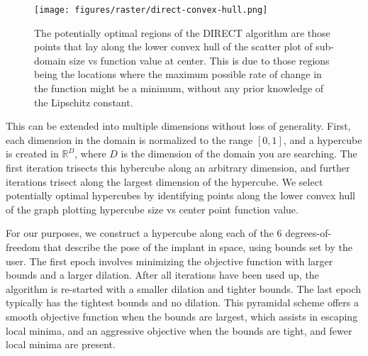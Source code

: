 \begin{figure}[h!]
    \begin{center}
      \texttt{[image: figures/raster/direct-convex-hull.png]}
    \end{center}
    \caption[The potentially optimal regions of the DIRECT algorithm are those points that lay along the lower convex hull of the scatter plot of sub-domain size vs function value at center]{The potentially optimal regions of the DIRECT algorithm are those points that lay along the lower convex hull of the scatter plot of sub-domain size vs function value at center. This is due to those regions being the locations where the maximum possible rate of change in the function might be a minimum, without any prior knowledge of the Lipschitz constant.}
    \label{fig:direct-convex-hull}
\end{figure}

This can be extended into multiple dimensions without loss of generality. First, each dimension in the domain is normalized to the range $[0,1]$, and a hypercube is created in $\mathbb{R}^D$, where $D$ is the dimension of the domain you are searching. The first iteration trisects this hybercube along an arbitrary dimension, and further iterations trisect along the largest dimension of the hypercube. We select potentially optimal hypercubes by identifying points along the lower convex hull of the graph plotting hypercube size vs center point function value.


For our purposes, we construct a hypercube along each of the 6 degrees-of-freedom that describe the pose of the implant in space, using bounds set by the user. The first epoch involves minimizing the objective function with larger bounds and a larger dilation. After all iterations have been used up, the algorithm is re-started with a smaller dilation and tighter bounds. The last epoch typically has the tightest bounds and no dilation. This pyramidal scheme offers a smooth objective function when the bounds are largest, which assists in escaping local minima, and an aggressive objective when the bounds are tight, and fewer local minima are present.

